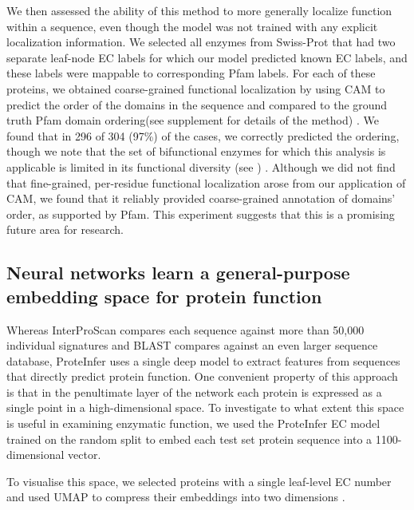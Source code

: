 
We then assessed the ability of this method to more generally localize function within a sequence, even though the model was not trained with any explicit localization information. We selected all enzymes from Swiss-Prot that had two separate leaf-node EC labels for which our model predicted known EC labels, and these labels were mappable to corresponding Pfam labels. For each of these proteins, we obtained coarse-grained functional localization by using CAM to predict the order of the domains in the sequence and compared to the ground truth Pfam domain ordering\textnormal{(see supplement for details of the method)}%
. We found that in 296 of 304 (97\%) of the cases, we correctly predicted the ordering, though we note that the set of bifunctional enzymes for which this analysis is applicable is limited in its functional diversity \textnormal{(see \DIFdelbegin {}\DIFdelend \DIFaddbegin {}\DIFaddend )}%
. Although we did not find that fine-grained, per-residue functional localization arose from our application of CAM, we found that it reliably provided coarse-grained annotation of domains' order, as supported by Pfam. This experiment suggests that this is a promising future area for research.
\subsection*{Neural networks learn a general-purpose embedding space for protein function}
Whereas InterProScan compares each sequence against more than 50,000 %
individual signatures and BLAST compares against an even larger sequence database, ProteInfer uses a single deep model to extract features from sequences that directly predict protein function. One convenient property of this approach is that in the penultimate layer of the network each protein is expressed as a single point in a high-dimensional space. To investigate to what extent this space is useful in examining enzymatic function, we used the ProteInfer EC model trained on the random split to embed each test set protein sequence into a 1100-dimensional vector. 

To visualise this space, we selected proteins with a single leaf-level EC number and used UMAP to compress their embeddings into two dimensions \citep{umap}.

